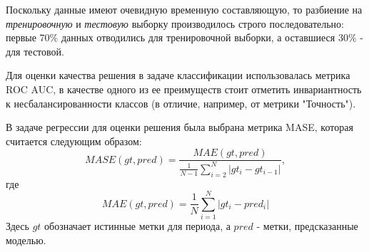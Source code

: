 
Поскольку данные имеют очевидную временную составляющую, то разбиение на \textit{тренировочную} и \textit{тестовую} выборку производилось строго последовательно: первые 70\% данных отводились для тренировочной выборки, а оставшиеся 30\% - для тестовой.

Для оценки качества решения в задаче классификации использовалась метрика ROC AUC, в качестве одного из ее преимуществ стоит отметить инвариантность к несбалансированности классов (в отличие, например, от метрики "Точность").

В задаче регрессии для оценки решения была выбрана метрика MASE, которая считается следующим образом:
$$
MASE(gt, pred) = \frac{MAE(gt, pred)}{\frac{1}{N-1}\sum_{i=2}^{N} |gt_i - gt_{i-1}|},
$$ где 
$$MAE(gt, pred) = \frac{1}{N}\sum_{i=1}^{N} |gt_i - pred_i|$$
Здесь $gt$ обозначает истинные метки для периода, а $pred$ - метки, предсказанные моделью.

